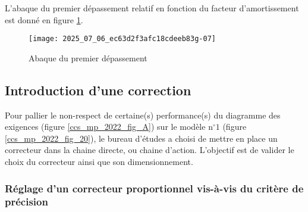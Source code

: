 L'abaque du premier dépassement relatif en fonction du facteur d'amortissement est donné en figure \ref{ccs_mp_2022_fig_09}.





\begin{figure}[!h]
\centering
\texttt{[image: 2025\_07\_06\_ec63d2f3afc18cdeeb83g-07]}
\caption{\label{ccs_mp_2022_fig_09}Abaque du premier dépassement}
\end{figure}


\subsection{Introduction d'une correction \label{ccs_mp_2022_sec_3B}}

\begin{obj}
Pour pallier le non-respect de certaine(s) performance(s) du diagramme des exigences (figure \ref{ccs_mp_2022_fig_A}) sur le modèle $\mathrm{n}^{\circ} 1$ (figure \ref{ccs_mp_2022_fig_20}), le bureau d'études a choisi de mettre en place un correcteur dans la chaine directe, ou chaine d'action. L'objectif est de valider le choix du correcteur ainsi que son dimensionnement.
\end{obj}

\subsubsection{Réglage d'un correcteur proportionnel vis-à-vis du critère de précision \label{ccs_mp_2022_sec_3B1}}


